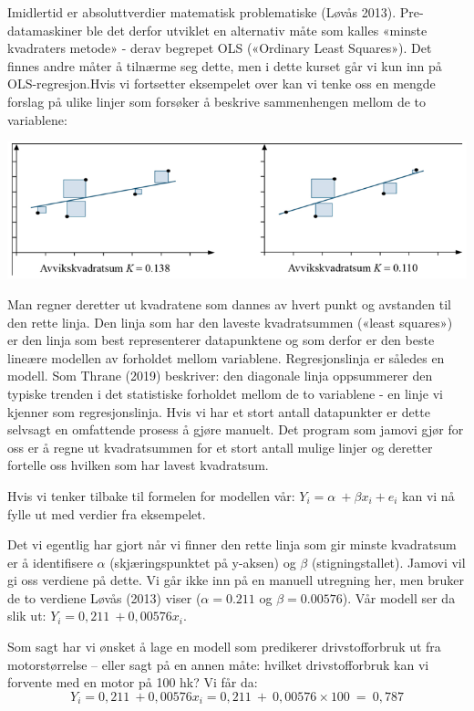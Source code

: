 \documentclass[
]{article}
\begin{document}
Imidlertid er absoluttverdier matematisk problematiske (Løvås 2013).
Pre-datamaskiner ble det derfor utviklet en alternativ måte som kalles
«minste kvadraters metode» - derav begrepet OLS («Ordinary Least
Squares»). Det finnes andre måter å tilnærme seg dette, men i dette
kurset går vi kun inn på OLS-regresjon.Hvis vi fortsetter eksempelet
over kan vi tenke oss en mengde forslag på ulike linjer som forsøker å
beskrive sammenhengen mellom de to variablene:

\includegraphics{Teori_fig4.png}

Man regner deretter ut kvadratene som dannes av hvert punkt og avstanden
til den rette linja. Den linja som har den laveste kvadratsummen («least
squares») er den linja som best representerer datapunktene og som derfor
er den beste lineære modellen av forholdet mellom variablene.
Regresjonslinja er således en modell. Som Thrane (2019) beskriver: den
diagonale linja oppsummerer den typiske trenden i det statistiske
forholdet mellom de to variablene - en linje vi kjenner som
regresjonslinja. Hvis vi har et stort antall datapunkter er dette
selvsagt en omfattende prosess å gjøre manuelt. Det program som jamovi
gjør for oss er å regne ut kvadratsummen for et stort antall mulige
linjer og deretter fortelle oss hvilken som har lavest kvadratsum.

Hvis vi tenker tilbake til formelen for modellen vår:
\(Y_i=\alpha\:+\beta x_i+e_i\) kan vi nå fylle ut med verdier fra
eksempelet.

Det vi egentlig har gjort når vi finner den rette linja som gir minste
kvadratsum er å identifisere \(\alpha\) (skjæringspunktet på y-aksen) og
\(\beta\) (stigningstallet). Jamovi vil gi oss verdiene på dette. Vi går
ikke inn på en manuell utregning her, men bruker de to verdiene Løvås
(2013) viser (\(\alpha=0.211\) og \(\beta=0.00576\)). Vår modell ser da
slik ut: \(Y_i=0,211\:+0,00576x_i\).

Som sagt har vi ønsket å lage en modell som predikerer drivstofforbruk
ut fra motorstørrelse -- eller sagt på en annen måte: hvilket
drivstofforbruk kan vi forvente med en motor på 100 hk? Vi får da:
\[Y_i=0,211\:+0,00576x_i=0,211\:+\:0,00576\times100\:=\:0,787\]
\end{document}
